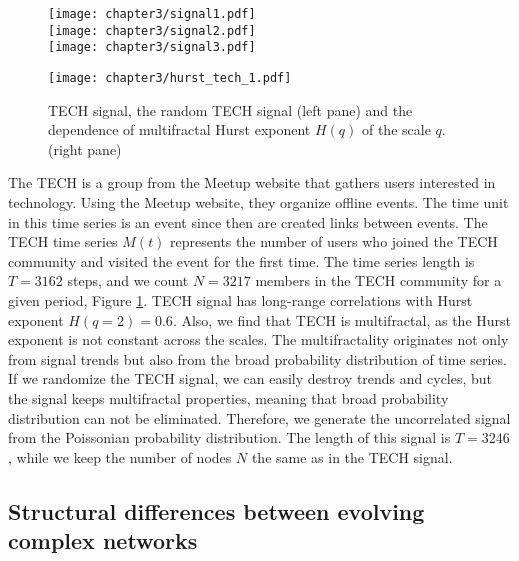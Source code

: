 \begin{figure}[ht]
	\centering
	\begin{minipage}[b]{0.4\textwidth}
		\centering
		\texttt{[image: chapter3/signal1.pdf]}\\
		\texttt{[image: chapter3/signal2.pdf]}\\
		\texttt{[image: chapter3/signal3.pdf]}
		
	\end{minipage}
	\begin{minipage}[b]{0.45\textwidth}
		\centering
		\texttt{[image: chapter3/hurst\_tech\_1.pdf]}
		\vspace{1cm}
	\end{minipage}
	\caption[Properties of the TECH and Poisson signals.]{TECH signal, the random TECH signal (left pane) and the dependence of multifractal Hurst exponent $H(q)$ of the scale $q$. (right pane)}
	\label{fig:tech_signals}
\end{figure}

The TECH is a group from the Meetup website that gathers users interested in technology. Using the Meetup website, they organize offline events. The time unit in this time series is an event since then are created links between events. The TECH time series $M(t)$ represents the number of users who joined the TECH community and visited the event for the first time. The time series length is $T=3162$ steps, and we count $N=3217$ members in the TECH community for a given period, Figure \ref{fig:tech_signals}. TECH signal has long-range correlations with Hurst exponent $H(q=2)=0.6$. Also, we find that TECH is multifractal, as the Hurst exponent is not constant across the scales. The multifractality originates not only from signal trends but also from the broad probability distribution of time series. If we randomize the TECH signal, we can easily destroy trends and cycles, but the signal keeps multifractal properties, meaning that broad probability distribution can not be eliminated. Therefore, we generate the uncorrelated signal from the Poissonian probability distribution. The length of this signal is  $T = 3246$, while we keep the number of nodes $N$ the same as in the TECH signal.


\subsection{Structural differences between evolving complex networks}

